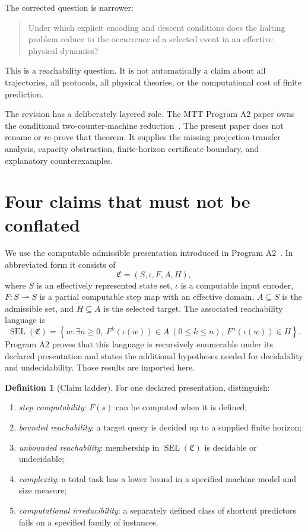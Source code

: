 \documentclass[11pt]{article}
\theoremstyle{definition}
\newtheorem{definition}[theorem]{Definition}
\theoremstyle{remark}
\newcommand{\SEL}{\operatorname{SEL}}
\begin{document}
The corrected question is narrower:
\begin{quote}
Under which explicit encoding and descent conditions does the halting problem
reduce to the occurrence of a selected event in an effective physical
dynamics?
\end{quote}
This is a reachability question.  It is not automatically a claim about all
trajectories, all protocols, all physical theories, or the computational cost
of finite prediction.

The revision has a deliberately layered role.  The MTT Program A2 paper owns
the conditional two-counter-machine reduction~\cite{NeroA2}.  The present
paper does not rename or re-prove that theorem.  It supplies the missing
projection-transfer analysis, capacity obstruction, finite-horizon certificate
boundary, and explanatory counterexamples.

\section{Four claims that must not be conflated}

We use the computable admissible presentation introduced in Program
A2~\cite{NeroA2}.  In abbreviated form it consists of
\[
  \mathfrak C=(S,\iota,F,A,H),
\]
where \(S\) is an effectively represented state set, \(\iota\) is a computable
input encoder, \(F:S\rightharpoonup S\) is a partial computable step map with an
effective domain, \(A\subseteq S\) is the admissible set, and \(H\subseteq A\)
is the selected target.  The associated reachability language is
\[
 \SEL(\mathfrak C)
 =
 \left\{w:\exists n\geq 0,\
 F^k(\iota(w))\in A\ (0\leq k\leq n),\
 F^n(\iota(w))\in H\right\}.
\]
Program A2 proves that this language is recursively enumerable under its
declared presentation and states the additional hypotheses needed for
decidability and undecidability.  Those results are imported here.

\begin{definition}[Claim ladder]
For one declared presentation, distinguish:
\begin{enumerate}[label=(C\arabic*)]
\item \emph{step computability}: \(F(s)\) can be computed when it is defined;
\item \emph{bounded reachability}: a target query is decided up to a supplied
finite horizon;
\item \emph{unbounded reachability}: membership in \(\SEL(\mathfrak C)\) is
decidable or undecidable;
\item \emph{complexity}: a total task has a lower bound in a specified machine
model and size measure;
\item \emph{computational irreducibility}: a separately defined class of
shortcut predictors fails on a specified family of instances.
\end{enumerate}
\end{definition}
\end{document}
